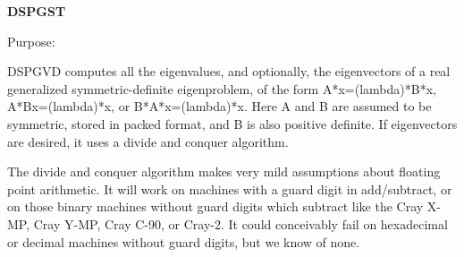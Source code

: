 {\bfseries D\+S\+P\+G\+S\+T} 

 \begin{DoxyParagraph}{Purpose\+: }
\begin{DoxyVerb} DSPGVD computes all the eigenvalues, and optionally, the eigenvectors
 of a real generalized symmetric-definite eigenproblem, of the form
 A*x=(lambda)*B*x,  A*Bx=(lambda)*x,  or B*A*x=(lambda)*x.  Here A and
 B are assumed to be symmetric, stored in packed format, and B is also
 positive definite.
 If eigenvectors are desired, it uses a divide and conquer algorithm.

 The divide and conquer algorithm makes very mild assumptions about
 floating point arithmetic. It will work on machines with a guard
 digit in add/subtract, or on those binary machines without guard
 digits which subtract like the Cray X-MP, Cray Y-MP, Cray C-90, or
 Cray-2. It could conceivably fail on hexadecimal or decimal machines
 without guard digits, but we know of none.\end{DoxyVerb}
 
\end{DoxyParagraph}

